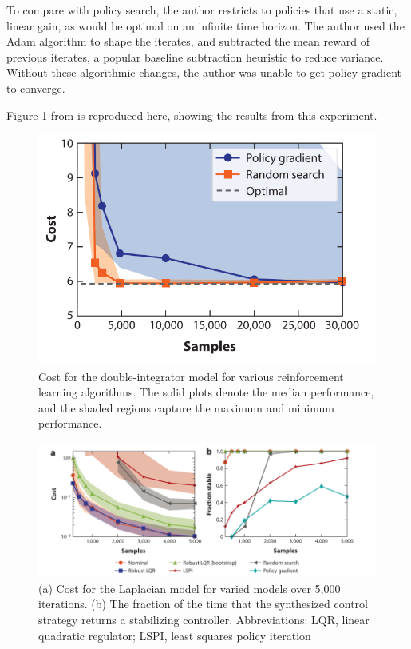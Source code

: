 \documentclass{article}[12pt]
\begin{document}
To compare with policy search, the author restricts to policies that use a static, linear gain, as would be optimal on an infinite time horizon. The author used the Adam algorithm to shape the iterates, and subtracted the mean reward of previous iterates, a popular baseline subtraction heuristic to reduce variance. Without these algorithmic changes, the author was unable to get policy gradient to converge.

Figure 1 from \cite{Recht2019} is reproduced here, showing the results from this experiment.

\begin{figure}
\begin{center}
\includegraphics[width = 0.6\linewidth]{fig1}
\caption{Cost for the double-integrator model for various reinforcement learning algorithms. The solid plots denote the median performance, and the shaded regions capture the maximum and minimum performance.}
\end{center}
\end{figure}

\begin{figure}[H]
\begin{center}
\includegraphics[width = 0.9\linewidth]{fig2}
\caption{(a) Cost for the Laplacian model for varied models over 5,000 iterations. (b) The fraction of the time that the synthesized control strategy returns a stabilizing controller. Abbreviations: LQR, linear quadratic regulator; LSPI, least squares policy iteration}
\end{center}
\end{figure}
\end{document}
